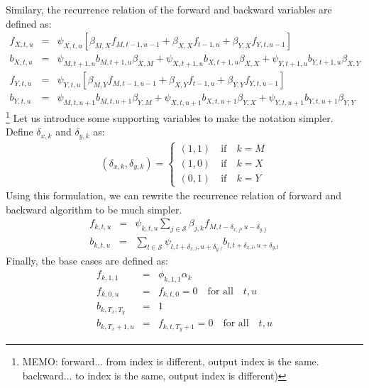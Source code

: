 Similary, the recurrence relation of the forward and backward variables are defined as:
\begin{eqnarray}
  f_{X,t,u} &=& \psi_{X, t, u} [\beta_{M,X} f_{M,t-1,u-1} + \beta_{X,X} f_{t-1, u} + \beta_{Y,X} f_{Y, t, u-1}] \\
  b_{X,t,u} &=& \psi_{M, t+1, u} b_{M, t+1, u} \beta_{X,M} + \psi_{X, t+1, u} b_{X, t+1, u} \beta_{X,X} + \psi_{Y, t+1, u} b_{Y, t+1, u} \beta_{X,Y} \\
  f_{Y,t,u} &=& \psi_{Y, t, u} [\beta_{M,Y} f_{M,t-1,u-1} + \beta_{X,Y} f_{t-1, u} + \beta_{Y,Y} f_{Y, t, u-1}]\\
  b_{Y,t,u} &=& \psi_{M, t, u+1} b_{M, t, u+1} \beta_{Y,M} + \psi_{X, t, u+1} b_{X, t, u+1} \beta_{Y,X} + \psi_{Y, t, u+1} b_{Y, t, u+1} \beta_{Y,Y}
\end{eqnarray}
\footnote{MEMO: forward... from index is different, output index is the same. backward... to index is the same, output index is different)} 
Let us introduce some supporting variables to make the notation simpler. Define $\delta_{x,k}$ and $\delta_{y,k}$ as:
\begin{eqnarray}
(\delta_{x, k}, \delta_{y, k}) =  
  \begin{cases}
    (1,1) \quad \mbox{if} \quad k = M \\
    (1,0) \quad \mbox{if} \quad k = X \\
    (0,1) \quad \mbox{if} \quad k = Y
  \end{cases}
\end{eqnarray}
Using this formulation, we can rewrite the recurrence relation of forward and backward algorithm to be much simpler.
\begin{eqnarray}
  f_{k,t,u} &=& \psi_{k, t, u} \sum_{j \in \mathcal{S}}\beta_{j,k} f_{M,t - \delta_{x, j}, u-\delta_{y, j}} \\
  b_{k,t,u} &=& \sum_{l \in \mathcal{S}} \psi_{l, t+\delta_{x, l}, u + \delta_{y,l}} b_{l, t+\delta_{x, l}, u + \delta_{y,l}}
\end{eqnarray}
Finally, the base cases are defined as:
\begin{eqnarray}
f_{k,1,1} &=& \phi_{k,1,1} \alpha_k \\
f_{k,0,u} &=& f_{k,t,0} = 0 \quad \text{for all} \quad t,u \\
b_{k,T_x,T_y} &=& 1 \\
b_{k,T_x + 1,u} &=& f_{k,t,T_y+1} = 0 \quad \text{for all} \quad t,u
\end{eqnarray}

